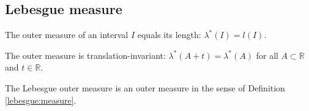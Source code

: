 \subsection{Lebesgue measure}


    \begin{property}[Intervals]
        The outer measure of an interval $I$ equals its length: $\lambda^*(I) = l(I)$.
    \end{property}
    \begin{property}[Translation]\label{lebesgue:translation_invariant}
        The outer measure is translation-invariant: $\lambda^*(A+t) = \lambda^*(A)$ for all $A\subset\mathbb{R}$ and $t\in\mathbb{R}$.
    \end{property}
    \begin{property}
        The Lebesgue outer measure is an outer measure in the sense of Definition \ref{lebesgue:measure}.
    \end{property}

